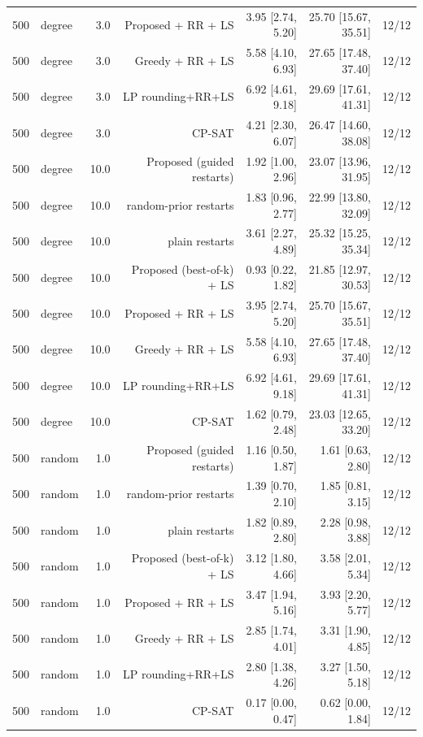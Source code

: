 \begin{table}[t]
\begin{tabular}{llrrrrr}
500 & degree & 3.0 & Proposed + RR + LS & 3.95 [2.74, 5.20] & 25.70 [15.67, 35.51] & 12/12 \\
500 & degree & 3.0 & Greedy + RR + LS & 5.58 [4.10, 6.93] & 27.65 [17.48, 37.40] & 12/12 \\
500 & degree & 3.0 & LP rounding+RR+LS & 6.92 [4.61, 9.18] & 29.69 [17.61, 41.31] & 12/12 \\
500 & degree & 3.0 & CP-SAT & 4.21 [2.30, 6.07] & 26.47 [14.60, 38.08] & 12/12 \\
500 & degree & 10.0 & Proposed (guided restarts) & 1.92 [1.00, 2.96] & 23.07 [13.96, 31.95] & 12/12 \\
500 & degree & 10.0 & random-prior restarts & 1.83 [0.96, 2.77] & 22.99 [13.80, 32.09] & 12/12 \\
500 & degree & 10.0 & plain restarts & 3.61 [2.27, 4.89] & 25.32 [15.25, 35.34] & 12/12 \\
500 & degree & 10.0 & Proposed (best-of-k) + LS & 0.93 [0.22, 1.82] & 21.85 [12.97, 30.53] & 12/12 \\
500 & degree & 10.0 & Proposed + RR + LS & 3.95 [2.74, 5.20] & 25.70 [15.67, 35.51] & 12/12 \\
500 & degree & 10.0 & Greedy + RR + LS & 5.58 [4.10, 6.93] & 27.65 [17.48, 37.40] & 12/12 \\
500 & degree & 10.0 & LP rounding+RR+LS & 6.92 [4.61, 9.18] & 29.69 [17.61, 41.31] & 12/12 \\
500 & degree & 10.0 & CP-SAT & 1.62 [0.79, 2.48] & 23.03 [12.65, 33.20] & 12/12 \\
500 & random & 1.0 & Proposed (guided restarts) & 1.16 [0.50, 1.87] & 1.61 [0.63, 2.80] & 12/12 \\
500 & random & 1.0 & random-prior restarts & 1.39 [0.70, 2.10] & 1.85 [0.81, 3.15] & 12/12 \\
500 & random & 1.0 & plain restarts & 1.82 [0.89, 2.80] & 2.28 [0.98, 3.88] & 12/12 \\
500 & random & 1.0 & Proposed (best-of-k) + LS & 3.12 [1.80, 4.66] & 3.58 [2.01, 5.34] & 12/12 \\
500 & random & 1.0 & Proposed + RR + LS & 3.47 [1.94, 5.16] & 3.93 [2.20, 5.77] & 12/12 \\
500 & random & 1.0 & Greedy + RR + LS & 2.85 [1.74, 4.01] & 3.31 [1.90, 4.85] & 12/12 \\
500 & random & 1.0 & LP rounding+RR+LS & 2.80 [1.38, 4.26] & 3.27 [1.50, 5.18] & 12/12 \\
500 & random & 1.0 & CP-SAT & 0.17 [0.00, 0.47] & 0.62 [0.00, 1.84] & 12/12 \\

\end{tabular}
\end{table}
